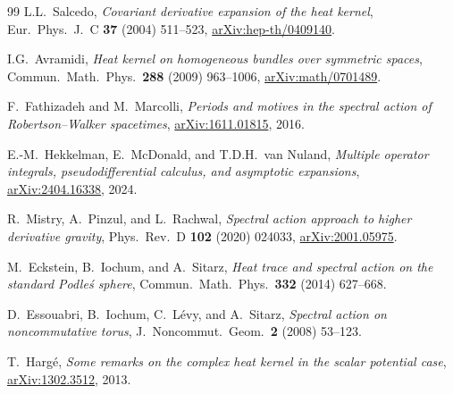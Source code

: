 \documentclass[11pt,a4paper]{article}
\theoremstyle{plain}
\theoremstyle{definition}
\begin{document}
\begin{thebibliography}{99}
L.L.~Salcedo,
\textit{Covariant derivative expansion of the heat kernel},
Eur.\ Phys.\ J.~C \textbf{37} (2004) 511--523,
\href{https://arxiv.org/abs/hep-th/0409140}{arXiv:hep-th/0409140}.

I.G.~Avramidi,
\textit{Heat kernel on homogeneous bundles over symmetric spaces},
Commun.\ Math.\ Phys.\ \textbf{288} (2009) 963--1006,
\href{https://arxiv.org/abs/math/0701489}{arXiv:math/0701489}.

F.~Fathizadeh and M.~Marcolli,
\textit{Periods and motives in the spectral action of Robertson--Walker
spacetimes},
\href{https://arxiv.org/abs/1611.01815}{arXiv:1611.01815}, 2016.

E.-M.~Hekkelman, E.~McDonald, and T.D.H.~van Nuland,
\textit{Multiple operator integrals, pseudodifferential calculus,
and asymptotic expansions},
\href{https://arxiv.org/abs/2404.16338}{arXiv:2404.16338}, 2024.

R.~Mistry, A.~Pinzul, and L.~Rachwal,
\textit{Spectral action approach to higher derivative gravity},
Phys.\ Rev.\ D \textbf{102} (2020) 024033,
\href{https://arxiv.org/abs/2001.05975}{arXiv:2001.05975}.

M.~Eckstein, B.~Iochum, and A.~Sitarz,
\textit{Heat trace and spectral action on the standard Podle\'{s} sphere},
Commun.\ Math.\ Phys.\ \textbf{332} (2014) 627--668.

D.~Essouabri, B.~Iochum, C.~L\'{e}vy, and A.~Sitarz,
\textit{Spectral action on noncommutative torus},
J.\ Noncommut.\ Geom.\ \textbf{2} (2008) 53--123.

T.~Harg\'{e},
\textit{Some remarks on the complex heat kernel in the scalar
potential case},
\href{https://arxiv.org/abs/1302.3512}{arXiv:1302.3512}, 2013.

\end{thebibliography}
\end{document}
